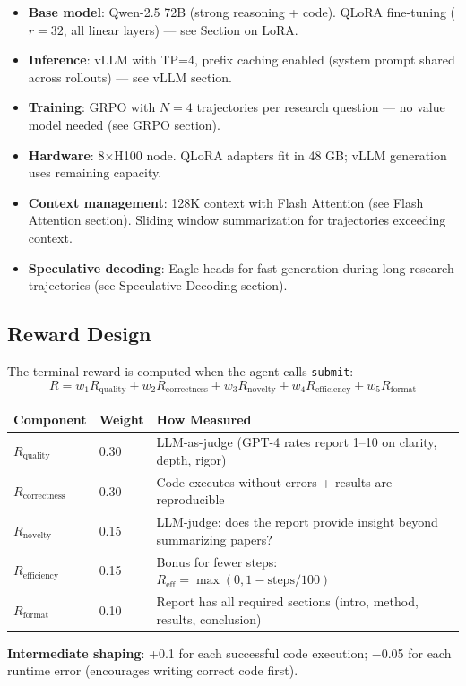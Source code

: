 \begin{keybox}
\begin{itemize}
  \item \textbf{Base model}: Qwen-2.5 72B (strong reasoning + code). QLoRA fine-tuning ($r=32$, all linear layers) --- see Section on LoRA.
  \item \textbf{Inference}: vLLM with TP=4, prefix caching enabled (system prompt shared across rollouts) --- see vLLM section.
  \item \textbf{Training}: GRPO with $N=4$ trajectories per research question --- no value model needed (see GRPO section).
  \item \textbf{Hardware}: 8$\times$H100 node. QLoRA adapters fit in 48 GB; vLLM generation uses remaining capacity.
  \item \textbf{Context management}: 128K context with Flash Attention (see Flash Attention section). Sliding window summarization for trajectories exceeding context.
  \item \textbf{Speculative decoding}: Eagle heads for fast generation during long research trajectories (see Speculative Decoding section).
\end{itemize}
\end{keybox}

\subsection{Reward Design}
\label{reward-design}

\begin{keybox}
The terminal reward is computed when the agent calls \texttt{submit}: 
\[
R = w_1 R_{\text{quality}} + w_2 R_{\text{correctness}} + w_3 R_{\text{novelty}} + w_4 R_{\text{efficiency}} + w_5 R_{\text{format}}
\]

\begin{tabular}{@{}lp{5cm}p{8cm}@{}}
\toprule
\textbf{Component} & \textbf{Weight} & \textbf{How Measured} \\
\midrule
$R_{\text{quality}}$ & 0.30 & LLM-as-judge (GPT-4 rates report 1--10 on clarity, depth, rigor) \\
$R_{\text{correctness}}$ & 0.30 & Code executes without errors + results are reproducible \\
$R_{\text{novelty}}$ & 0.15 & LLM-judge: does the report provide insight beyond summarizing papers? \\
$R_{\text{efficiency}}$ & 0.15 & Bonus for fewer steps: $R_{\text{eff}} = \max(0, 1 - \text{steps}/100)$ \\
$R_{\text{format}}$ & 0.10 & Report has all required sections (intro, method, results, conclusion) \\
\bottomrule
\end{tabular}

\textbf{Intermediate shaping}: +0.1 for each successful code execution; $-$0.05 for each runtime error (encourages writing correct code first).
\end{keybox}

